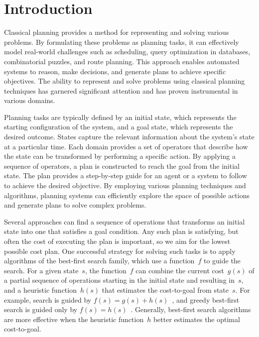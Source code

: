 \chapter{Introduction}
\label{sec:intro}

Classical planning provides a method for representing and solving various problems. By formulating these problems as planning tasks, it can effectively model real-world challenges such as scheduling, query optimization in databases, combinatorial puzzles, and route planning. This approach enables automated systems to reason, make decisions, and generate plans to achieve specific objectives. The ability to represent and solve problems using classical planning techniques has garnered significant attention and has proven instrumental in various domains.

Planning tasks are typically defined by an initial state, which represents the starting configuration of the system, and a goal state, which represents the desired outcome. States capture the relevant information about the system's state at a particular time. Each domain provides a set of operators that describe how the state can be transformed by performing a specific action. By applying a sequence of operators, a plan is constructed to reach the goal from the initial state. The plan provides a step-by-step guide for an agent or a system to follow to achieve the desired objective. By employing various planning techniques and algorithms, planning systems can efficiently explore the space of possible actions and generate plans to solve complex problems.

Several approaches can find a sequence of operations that transforms an initial state into one that satisfies a goal condition. Any such plan is satisfying, but often the cost of executing the plan is important, so we aim for the lowest possible cost plan. One successful strategy for solving such tasks is to apply algorithms of the best-first search family, which use a function~$f$ to guide the search. For a given state~$s$, the function~$f$ can combine the current cost~$g(s)$ of a partial sequence of operations starting in the initial state and resulting in~$s$, and a heuristic function~$h(s)$ that estimates the cost-to-goal from state~$s$. For example, \astar search is guided by $f(s)=g(s)+h(s)$~\cite{hart-et-al-ieeessc1968}, and greedy best-first search is guided only by $f(s)=h(s)$~\cite{doran-michie-rsl1966}. Generally, best-first search algorithms are more effective when the heuristic function~$h$ better estimates the optimal cost-to-goal.

